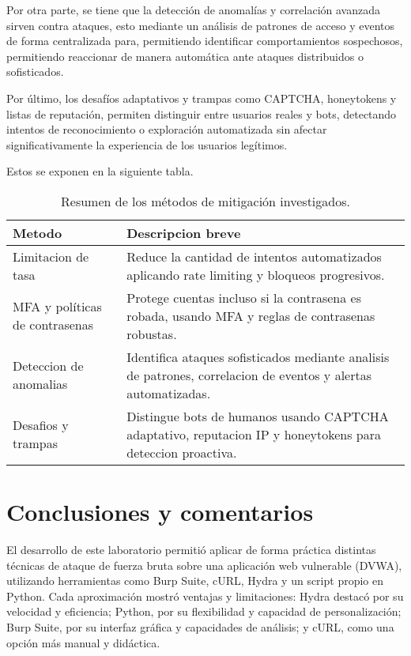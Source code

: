 \documentclass[letter,12pt]{article}
\begin{document}
Por otra parte, se tiene que la detección de anomalías y correlación avanzada sirven contra ataques, esto mediante un análisis de patrones de acceso y eventos de forma centralizada para, permitiendo identificar comportamientos sospechosos, permitiendo reaccionar de manera automática ante ataques distribuidos o sofisticados. 

Por último, los desafíos adaptativos y trampas como CAPTCHA, honeytokens y listas de reputación, permiten distinguir entre usuarios reales y bots, detectando intentos de reconocimiento o exploración automatizada sin afectar significativamente la experiencia de los usuarios legítimos.

Estos se exponen en la siguiente tabla.

\begin{table}[htbp]
\centering
\begin{tabular}{|l|p{10cm}|}
\hline
\textbf{Metodo} & \textbf{Descripcion breve} \\
\hline
Limitacion de tasa & Reduce la cantidad de intentos automatizados aplicando rate limiting y bloqueos progresivos. \\
\hline
MFA y políticas de contrasenas & Protege cuentas incluso si la contrasena es robada, usando MFA y reglas de contrasenas robustas. \\
\hline
Deteccion de anomalias & Identifica ataques sofisticados mediante analisis de patrones, correlacion de eventos y alertas automatizadas. \\
\hline
Desafios y trampas & Distingue bots de humanos usando CAPTCHA adaptativo, reputacion IP y honeytokens para deteccion proactiva. \\
\hline
\end{tabular}
\caption{Resumen de los métodos de mitigación investigados.}
\label{tab:mitigacion_compacta}
\end{table}


\section*{Conclusiones y comentarios}
El desarrollo de este laboratorio permitió aplicar de forma práctica distintas técnicas de ataque de fuerza bruta sobre una aplicación web vulnerable (DVWA), utilizando herramientas como Burp Suite, cURL, Hydra y un script propio en Python. Cada aproximación mostró ventajas y limitaciones: Hydra destacó por su velocidad y eficiencia; Python, por su flexibilidad y capacidad de personalización; Burp Suite, por su interfaz gráfica y capacidades de análisis; y cURL, como una opción más manual y didáctica.
\end{document}
